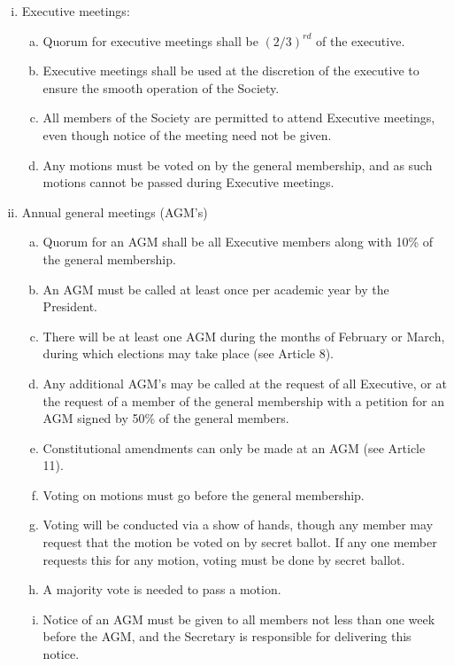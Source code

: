 \documentclass[]{report}
\begin{document}
\begin{enumerate}
\begin{enumerate}[i.]
				\item Executive meetings:
					\begin{enumerate}[(a)]
						\item Quorum for executive meetings shall be $ (2/3) ^{rd}$ of the executive.
						\item Executive meetings shall be used at the discretion of the executive to ensure the smooth operation of the Society.
						\item All members of the Society are permitted to attend Executive meetings, even though notice of the meeting need not be given.
						\item Any motions must be voted on by the general membership, and as such motions cannot be passed during Executive meetings.
					\end{enumerate}
				\item Annual general meetings (AGM's)
					\begin{enumerate}[(a)]
						\item Quorum for an AGM shall be all Executive members along with 10\% of the general membership.
						\item An AGM must be called at least once per academic year by the President.
						\item There will be at least one AGM during the months of February or March, during which elections may take place (see Article 8). 
						\item Any additional AGM's may be called at the request of all Executive, or at the request of a member of the general membership with a petition for an AGM signed by 50\% of the general members.
						\item Constitutional amendments can only be made at an AGM (see Article 11).
						\item Voting on motions must go before the general membership.
						\item Voting will be conducted via a show of hands, though any member may request that the motion be voted on by secret ballot. If any one member requests this for any motion, voting must be done by secret ballot.
						\item A majority vote is needed to pass a motion.
						\item Notice of an AGM must be given to all members not less than one week before the AGM, and the Secretary is responsible for delivering this notice.
					\end{enumerate}
			\end{enumerate}
			
	\end{enumerate}
\end{document}
